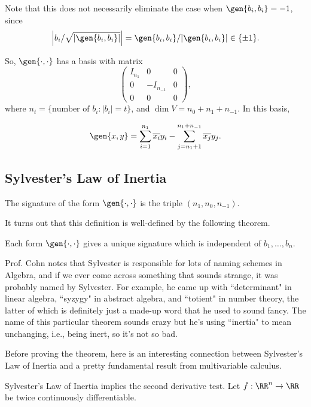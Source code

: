 Note that this does not necessarily eliminate the case when $\gen{b_i, b_i} = -1$, since 
\[\left\vert b_i/\sqrt{\vert \gen{b_i, b_i}\vert} \right\vert = \gen{b_i, b_i}/\vert\gen{b_i,b_i}\vert\in \{\pm 1\}. \]

So, $\gen{\cdot, \cdot}$ has a basis with matrix 
\[
\begin{pmatrix}
I_{n_1} & 0 & 0 \\
0 & -I_{n_{-1}} & 0 \\
0 & 0 & 0
\end{pmatrix},
\]
where $n_t = \{\text{number of }b_i : \vert b_i\vert =t\}$, and $\dim V = n_0+n_1+n_{-1}$. In this basis,

\[\gen{x,y} = \sum_{i=1}^{n_1} \overline{x_i}y_i - \sum_{j=n_1+1}^{n_1 + n_{-1}} \overline{x_j}y_j.\] 

\subsection{Sylvester's Law of Inertia}

\begin{definition}

The \ac{signature} of the form $\gen{\cdot, \cdot}$ is the triple $(n_1, n_0, n_{-1})$.
\end{definition}

It turns out that this definition is well-defined by the following theorem. 

\begin{theorem}

Each form $\gen{\cdot, \cdot}$ gives a unique signature which is independent of $b_1, \hdots, b_n$.
\end{theorem}

Prof. Cohn notes that Sylvester is responsible for lots of naming schemes in Algebra, and if we ever come across something that sounds strange, it was probably named by Sylvester. For example, he came up with ``determinant" in linear algebra, ``syzygy" in abstract algebra, and ``totient" in number theory, the latter of which is definitely just a made-up word that he used to sound fancy. The name of this particular theorem sounds crazy but he's using ``inertia" to mean unchanging, i.e., being inert, so it's not so bad.

Before proving the theorem, here is an interesting connection between Sylvester's Law of Inertia and a pretty fundamental result from multivariable calculus.

\begin{example}
\exlabel

Sylvester's Law of Inertia implies the second derivative test. Let $f: \RR^n\rightarrow \RR$ be twice continuously differentiable. 
\end{example}

